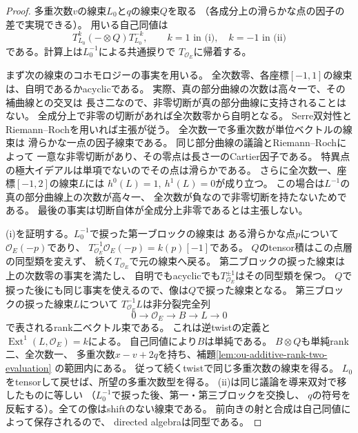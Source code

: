 \begin{proof}
多重次数$v$の線束$L_0$と$q$の線束$Q$を取る
（各成分上の滑らかな点の因子の差で実現できる）。
用いる自己同値は
\[
 T_{L_0}^{k}(-\otimes Q)T_{L_0}^{-k},
 \qquad k=1\text{ in (i)},\quad k=-1\text{ in (ii)}
\]
である。計算上は$L_0^{-1}$による共通捩りで
$T_{\mathcal O_E}$に帰着する。

まず次の線束のコホモロジーの事実を用いる。
全次数零、各座標$[-1,1]$の線束は、自明であるかacyclicである。
実際、真の部分曲線の次数は高々一で、その補曲線との交叉は
長さ二なので、非零切断が真の部分曲線に支持されることはない。
全成分上で非零の切断があれば全次数零から自明となる。
Serre双対性とRiemann--Rochを用いれば主張が従う。
全次数一で多重次数が単位ベクトルの線束は
滑らかな一点の因子線束である。
同じ部分曲線の議論とRiemann--Rochによって
一意な非零切断があり、その零点は長さ一のCartier因子である。
特異点の極大イデアルは単項でないのでその点は滑らかである。
さらに全次数一、座標$[-1,2]$の線束$L$には
$h^0(L)=1,\ h^1(L)=0$が成り立つ。
この場合は$L^{-1}$の真の部分曲線上の次数が高々一、
全次数が負なので非零切断を持たないためである。
最後の事実は切断自体が全成分上非零であるとは主張しない。

(i)を証明する。$L_0^{-1}$で捩った第一ブロックの線束は
ある滑らかな点$p$について$\mathcal O_E(-p)$であり、
$T_{\mathcal O_E}^{-1}\mathcal O_E(-p)=k(p)[-1]$である。
$Q$のtensor積はこの点層の同型類を変えず、
続く$T_{\mathcal O_E}$で元の線束へ戻る。
第二ブロックの捩った線束は上の次数零の事実を満たし、
自明でもacyclicでも$T_{\mathcal O_E}^{\pm1}$はその同型類を保つ。
$Q$で捩った後にも同じ事実を使えるので、像は$Q$で捩った線束となる。
第三ブロックの捩った線束$L$について
$T_{\mathcal O_E}^{-1}L$は非分裂完全列
\[
 0\longrightarrow\mathcal O_E\longrightarrow
 B\longrightarrow L\longrightarrow0
\]
で表されるrank二ベクトル束である。
これは逆twistの定義と$\operatorname{Ext}^1(L,\mathcal O_E)=k$による。
自己同値により$B$は単純である。
$B\otimes Q$も単純rank二、全次数一、
多重次数$x-v+2q$を持ち、補題\ref{lem:ou-additive-rank-two-evaluation}
の範囲内にある。
従って続くtwistで同じ多重次数の線束を得る。
$L_0$をtensorして戻せば、所望の多重次数型を得る。
(ii)は同じ議論を導来双対で移したものに等しい
（$L_0^{-1}$で捩った後、第一・第三ブロックを交換し、
$q$の符号を反転する）。全ての像はshiftのない線束である。
前向きの射と合成は自己同値によって保存されるので、
directed algebraは同型である。
\end{proof}

